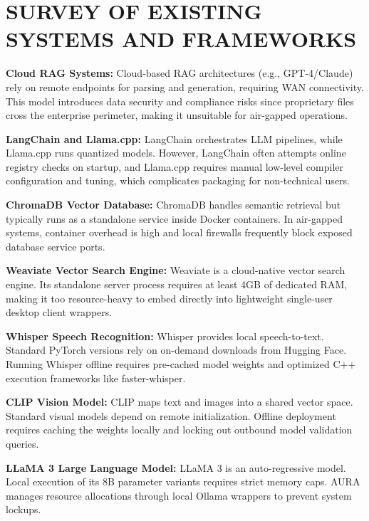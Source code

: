 \documentclass[12pt,a4paper]{report}
\begin{document}
\section{SURVEY OF EXISTING SYSTEMS AND FRAMEWORKS}

\noindent\textbf{Cloud RAG Systems:} Cloud-based RAG architectures (e.g., GPT-4/Claude) rely on remote endpoints for parsing and generation, requiring WAN connectivity. This model introduces data security and compliance risks since proprietary files cross the enterprise perimeter, making it unsuitable for air-gapped operations.

\vspace{0.3cm}
\noindent\textbf{LangChain and Llama.cpp:} LangChain orchestrates LLM pipelines, while Llama.cpp runs quantized models. However, LangChain often attempts online registry checks on startup, and Llama.cpp requires manual low-level compiler configuration and tuning, which complicates packaging for non-technical users.

\vspace{0.3cm}
\noindent\textbf{ChromaDB Vector Database:} ChromaDB handles semantic retrieval but typically runs as a standalone service inside Docker containers. In air-gapped systems, container overhead is high and local firewalls frequently block exposed database service ports.

\vspace{0.3cm}
\noindent\textbf{Weaviate Vector Search Engine:} Weaviate is a cloud-native vector search engine. Its standalone server process requires at least 4GB of dedicated RAM, making it too resource-heavy to embed directly into lightweight single-user desktop client wrappers.

\vspace{0.3cm}
\noindent\textbf{Whisper Speech Recognition:} Whisper provides local speech-to-text. Standard PyTorch versions rely on on-demand downloads from Hugging Face. Running Whisper offline requires pre-cached model weights and optimized C++ execution frameworks like faster-whisper.

\vspace{0.3cm}
\noindent\textbf{CLIP Vision Model:} CLIP maps text and images into a shared vector space. Standard visual models depend on remote initialization. Offline deployment requires caching the weights locally and locking out outbound model validation queries.

\vspace{0.3cm}
\noindent\textbf{LLaMA 3 Large Language Model:} LLaMA 3 is an auto-regressive model. Local execution of its 8B parameter variants requires strict memory caps. AURA manages resource allocations through local Ollama wrappers to prevent system lockups.
\end{document}
